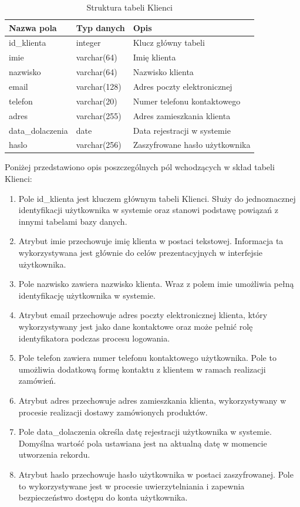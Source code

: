 \documentclass[a4paper,twoside,12pt]{book}
\begin{document}
\begin{table}[H]
\centering
\caption{Struktura tabeli Klienci}
\label{tab:klienci}
\begin{tabular}{lll}
\hline
Nazwa pola & Typ danych & Opis \\ \hline
id\_klienta & integer & Klucz główny tabeli \\
imie & varchar(64) & Imię klienta \\
nazwisko & varchar(64) & Nazwisko klienta \\
email & varchar(128) & Adres poczty elektronicznej \\
telefon & varchar(20) & Numer telefonu kontaktowego \\
adres & varchar(255) & Adres zamieszkania klienta \\
data\_dolaczenia & date & Data rejestracji w systemie \\
haslo & varchar(256) & Zaszyfrowane hasło użytkownika \\ \hline
\end{tabular}
\end{table}

Poniżej przedstawiono opis poszczególnych pól wchodzących w skład tabeli Klienci:

\begin{enumerate}
    \item Pole id\_klienta jest kluczem głównym tabeli Klienci. Służy do
    jednoznacznej identyfikacji użytkownika w systemie oraz stanowi podstawę
    powiązań z innymi tabelami bazy danych.

    \item Atrybut imie przechowuje imię klienta w postaci tekstowej. Informacja
    ta wykorzystywana jest głównie do celów prezentacyjnych w interfejsie
    użytkownika.

    \item Pole nazwisko zawiera nazwisko klienta. Wraz z polem imie umożliwia
    pełną identyfikację użytkownika w systemie.

    \item Atrybut email przechowuje adres poczty elektronicznej klienta, który
    wykorzystywany jest jako dane kontaktowe oraz może pełnić rolę identyfikatora
    podczas procesu logowania.

    \item Pole telefon zawiera numer telefonu kontaktowego użytkownika.
    Pole to umożliwia dodatkową formę kontaktu z klientem w ramach realizacji
    zamówień.

    \item Atrybut adres przechowuje adres zamieszkania klienta, wykorzystywany
    w procesie realizacji dostawy zamówionych produktów.

    \item Pole data\_dolaczenia określa datę rejestracji użytkownika w systemie.
    Domyślna wartość pola ustawiana jest na aktualną datę w momencie utworzenia
    rekordu.

    \item Atrybut haslo przechowuje hasło użytkownika w postaci zaszyfrowanej.
    Pole to wykorzystywane jest w procesie uwierzytelniania i zapewnia
    bezpieczeństwo dostępu do konta użytkownika.
\end{enumerate}
\end{document}
